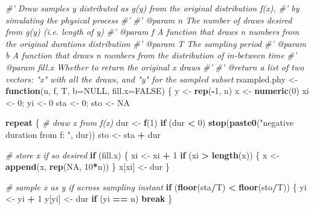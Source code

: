 \documentclass[]{article}
\newenvironment{Shaded}{\begin{snugshade}}{\end{snugshade}}
\newcommand{\CommentTok}[1]{\textcolor[rgb]{0.56,0.35,0.01}{\textit{#1}}}
\newcommand{\ControlFlowTok}[1]{\textcolor[rgb]{0.13,0.29,0.53}{\textbf{#1}}}
\newcommand{\DataTypeTok}[1]{\textcolor[rgb]{0.13,0.29,0.53}{#1}}
\newcommand{\DecValTok}[1]{\textcolor[rgb]{0.00,0.00,0.81}{#1}}
\newcommand{\KeywordTok}[1]{\textcolor[rgb]{0.13,0.29,0.53}{\textbf{#1}}}
\newcommand{\NormalTok}[1]{#1}
\newcommand{\OperatorTok}[1]{\textcolor[rgb]{0.81,0.36,0.00}{\textbf{#1}}}
\newcommand{\OtherTok}[1]{\textcolor[rgb]{0.56,0.35,0.01}{#1}}
\newcommand{\StringTok}[1]{\textcolor[rgb]{0.31,0.60,0.02}{#1}}
\begin{document}
\begin{Shaded}
\begin{Highlighting}[]
\CommentTok{#' Draw samples y distributed as g(y) from the original distribution f(x), }
\CommentTok{#'   by simulating the physical process}
\CommentTok{#'}
\CommentTok{#' @param n      The number of draws desired from g(y) (i.e. length of y)}
\CommentTok{#' @param f      A function that draws n numbers from the original durations distribution}
\CommentTok{#' @param T      The sampling period}
\CommentTok{#' @param b      A function that draws n numbers from the distribution of in-between time}
\CommentTok{#' @param fill.x Whether to return the original x draws}
\CommentTok{#'}
\CommentTok{#' @return a list of two vectors: "x" with all the draws, and "y" for the sampled subset}
\NormalTok{rsampled.phy <-}\StringTok{ }\ControlFlowTok{function}\NormalTok{(n, f, T, }\DataTypeTok{b=}\OtherTok{NULL}\NormalTok{, }\DataTypeTok{fill.x=}\OtherTok{FALSE}\NormalTok{) \{}
\NormalTok{  y <-}\StringTok{ }\KeywordTok{rep}\NormalTok{(}\OperatorTok{-}\DecValTok{1}\NormalTok{, n)}
\NormalTok{  x <-}\StringTok{ }\KeywordTok{numeric}\NormalTok{(}\DecValTok{0}\NormalTok{)}
\NormalTok{  xi <-}\StringTok{ }\DecValTok{0}\NormalTok{; yi <-}\StringTok{ }\DecValTok{0}
\NormalTok{  sta <-}\StringTok{ }\DecValTok{0}\NormalTok{; sto <-}\StringTok{ }\OtherTok{NA}
  
  \ControlFlowTok{repeat}\NormalTok{ \{}
    \CommentTok{# draw x from f(x)}
\NormalTok{    dur <-}\StringTok{ }\KeywordTok{f}\NormalTok{(}\DecValTok{1}\NormalTok{)}
    \ControlFlowTok{if}\NormalTok{ (dur }\OperatorTok{<}\StringTok{ }\DecValTok{0}\NormalTok{) }\KeywordTok{stop}\NormalTok{(}\KeywordTok{paste0}\NormalTok{(}\StringTok{"negative duration from f: "}\NormalTok{, dur))}
\NormalTok{    sto <-}\StringTok{ }\NormalTok{sta }\OperatorTok{+}\StringTok{ }\NormalTok{dur}
    
    \CommentTok{# store x if so desired}
    \ControlFlowTok{if}\NormalTok{ (fill.x) \{}
\NormalTok{      xi <-}\StringTok{ }\NormalTok{xi }\OperatorTok{+}\StringTok{ }\DecValTok{1}
      \ControlFlowTok{if}\NormalTok{ (xi }\OperatorTok{>}\StringTok{ }\KeywordTok{length}\NormalTok{(x)) \{}
\NormalTok{        x <-}\StringTok{ }\KeywordTok{append}\NormalTok{(x, }\KeywordTok{rep}\NormalTok{(}\OtherTok{NA}\NormalTok{, }\DecValTok{10}\OperatorTok{*}\NormalTok{n))}
\NormalTok{      \}  }
\NormalTok{      x[xi] <-}\StringTok{ }\NormalTok{dur}
\NormalTok{    \}}
     
    \CommentTok{# sample x as y if across sampling instant }
    \ControlFlowTok{if}\NormalTok{ (}\KeywordTok{floor}\NormalTok{(sta}\OperatorTok{/}\NormalTok{T) }\OperatorTok{<}\StringTok{ }\KeywordTok{floor}\NormalTok{(sto}\OperatorTok{/}\NormalTok{T)) \{}
\NormalTok{      yi <-}\StringTok{ }\NormalTok{yi }\OperatorTok{+}\StringTok{ }\DecValTok{1}
\NormalTok{      y[yi] <-}\StringTok{ }\NormalTok{dur}
      \ControlFlowTok{if}\NormalTok{ (yi }\OperatorTok{==}\StringTok{ }\NormalTok{n) }\ControlFlowTok{break}
\NormalTok{    \}}
    

\end{Highlighting}
\end{Shaded}
\end{document}
